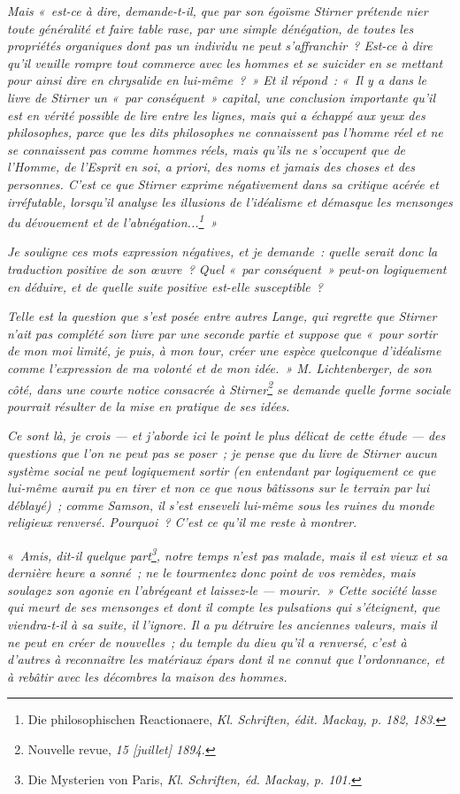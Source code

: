 \documentclass[french,twoside]{book} %
\newcommand\corr[1]{#1}
\begin{document}
\emph{Mais « est-ce à dire, demande-t-il, que par son égoïsme Stirner prétende nier toute généralité et faire table rase, par une simple dénégation, de toutes les propriétés organiques dont pas un individu ne peut s’affranchir ? Est-ce à dire qu’il veuille rompre tout commerce avec les hommes et se suicider en se mettant pour ainsi dire en chrysalide en lui-même ? » Et il répond : « Il y a dans le livre de Stirner un « par conséquent » capital, une conclusion importante qu’il est en vérité possible de lire entre les lignes, mais qui a échappé aux yeux des philosophes, parce que  les dits philosophes ne connaissent pas l’homme réel et ne se connaissent pas comme hommes réels, mais qu’ils ne s’occupent que de l’Homme, de l’Esprit en soi, a priori, des noms et jamais des choses et des personnes. C’est ce que Stirner \emph{exprime négativement} dans sa critique acérée et irréfutable, lorsqu’il analyse les illusions de l’idéalisme et démasque les mensonges du dévouement et de l’abnégation...\footnote{ \noindent Die philosophischen Reactionaere, \emph{Kl. Schriften, édit. Mackay, p. 182, 183.}
 } »}\par
\emph{Je souligne ces mots \emph{expression négatives}, et je demande : quelle serait donc la traduction positive de son œuvre ? Quel « par conséquent » peut-on logiquement en déduire, et de quelle suite positive est-elle susceptible ?}\par
\emph{Telle est la question que s’est posée entre autres Lange, qui regrette que Stirner n’ait pas complété son livre par une seconde partie et suppose que « pour sortir de mon moi limité, je puis, à mon tour, créer une espèce quelconque d’idéalisme comme l’expression de ma volonté et de mon idée. » M. Lichtenberger, de son côté, dans une courte notice consacrée à Stirner\footnote{ \noindent Nouvelle revue, \emph{15 [{\corr juillet}] 1894.}
 } se demande quelle forme sociale pourrait résulter de la mise en pratique de ses idées.}\par
\emph{Ce sont là, je crois — et j’aborde ici le point le plus délicat de cette étude — des questions que l’on ne peut pas se poser ; je pense que du livre de Stirner aucun système social ne peut logiquement sortir (en entendant par logiquement ce que lui-même aurait pu en tirer et non ce que nous bâtissons sur le terrain par lui déblayé) ; comme Samson, il s’est enseveli lui-même sous les ruines du monde religieux renversé. Pourquoi ? C’est ce qu’il me reste à montrer}.\par
« \emph{Amis, dit-il quelque part\footnote{ \noindent Die Mysterien von Paris, \emph{Kl. Schriften, éd. Mackay, p. 101.}
 }, notre temps n’est pas malade, mais il est vieux et sa dernière heure a sonné ; ne le tourmentez donc point de vos remèdes, mais soulagez  son agonie en l’abrégeant et laissez-le — mourir. » Cette société lasse qui meurt de ses mensonges et dont il compte les pulsations qui s’éteignent, que viendra-t-il à sa suite, il l’ignore. Il a pu détruire les anciennes valeurs, mais il ne peut en créer de nouvelles ; du temple du dieu qu’il a renversé, c’est à d’autres à reconnaître les matériaux épars dont il ne connut que l’ordonnance, et à rebâtir avec les décombres la maison des hommes.}\par
\end{document}
